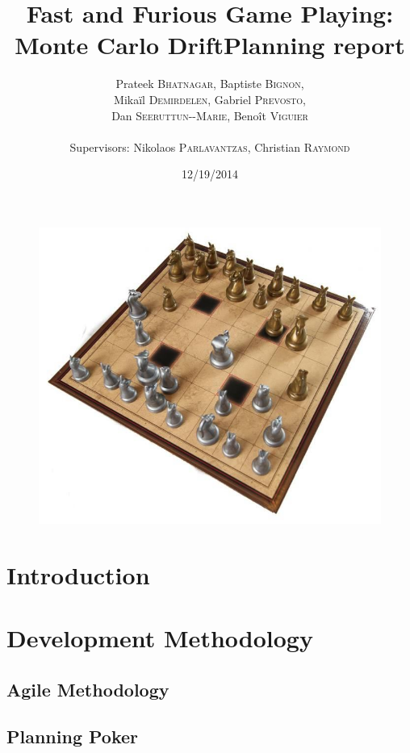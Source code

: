 \documentclass[12pt]{article}
\title{Fast and Furious Game Playing: Monte Carlo Drift\smallbreak Planning report} %
\author{Prateek \textsc{Bhatnagar}, Baptiste \textsc{Bignon}, \\
        Mikaïl \textsc{Demirdelen}, Gabriel \textsc{Prevosto}, \\
        Dan \textsc{Seeruttun-{}-Marie}, Benoît \textsc{Viguier} \\
        \\
        Supervisors: Nikolaos \textsc{Parlavantzas}, Christian \textsc{Raymond}}
\date{12/19/2014}
\begin{document}
\maketitle

\begin{figure}[!h] 
\centerline{\includegraphics[scale=0.50]{Pictures/arimaa}}
\end{figure}
\newpage

\tableofcontents
\newpage


\section{Introduction}					\label{sec:introduction} 		
\newpage	

\section{Development Methodology}			\label{sec:AgileMethod}
	\subsection{Agile Methodology}			\label{sec:method}			
	\subsection{Planning Poker}			\label{sec:PokerPlanning}		
\newpage
\end{document}

